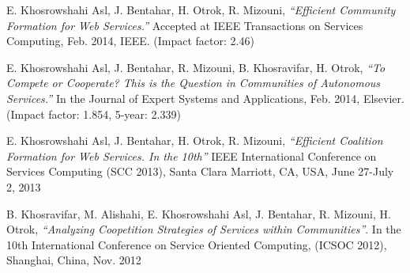     \begin{enumerate}
        \small{
        \item E. Khosrowshahi Asl, J. Bentahar, H. Otrok, R. Mizouni, \emph{``Efficient Community Formation for Web Services.''} Accepted at IEEE Transactions on Services Computing, Feb. 2014, IEEE. (Impact factor: 2.46)
        \item E. Khosrowshahi Asl, J. Bentahar, R. Mizouni, B. Khosravifar, H. Otrok, \emph{``To Compete or Cooperate? This is the Question in Communities of Autonomous Services.''} In the Journal of Expert Systems and Applications, Feb. 2014, Elsevier. (Impact factor: 1.854, 5-year:  2.339)
        \item E. Khosrowshahi Asl, J. Bentahar, H. Otrok, R. Mizouni, \emph{``Efficient Coalition Formation for Web Services. In the 10th''} IEEE  International Conference on Services Computing (SCC 2013), Santa Clara Marriott, CA, USA, June 27-July 2, 2013
        \item B. Khosravifar, M. Alishahi, E. Khosrowshahi Asl, J. Bentahar, R. Mizouni, H. Otrok, \emph{``Analyzing Coopetition Strategies of Services within Communities''}. In the 10th International Conference on Service Oriented Computing, (ICSOC 2012), Shanghai, China, Nov. 2012
        }
    \end{enumerate}

